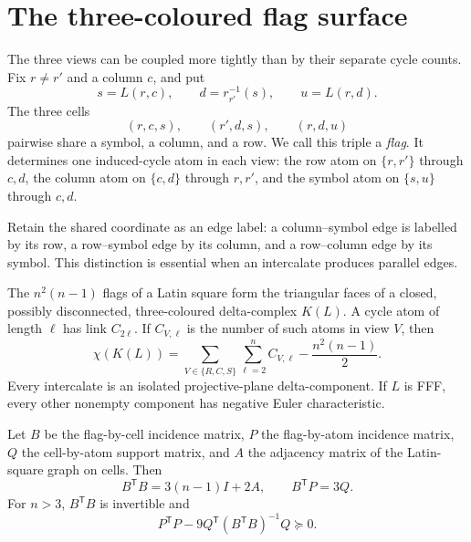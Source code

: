 \section{The three-coloured flag surface}\label{sec:flag-surface}

The three views can be coupled more tightly than by their separate cycle
counts.  Fix $r\ne r'$ and a column $c$, and put
\[
 s=L(r,c),\qquad d=r_{r'}^{-1}(s),\qquad u=L(r,d).
\]
The three cells
\[
 (r,c,s),\qquad (r',d,s),\qquad (r,d,u)
\]
pairwise share a symbol, a column, and a row.  We call this triple a
\emph{flag}.  It determines one induced-cycle atom in each view: the row
atom on $\{r,r'\}$ through $c,d$, the column atom on $\{c,d\}$ through
$r,r'$, and the symbol atom on $\{s,u\}$ through $c,d$.

Retain the shared coordinate as an edge label: a column--symbol edge is
labelled by its row, a row--symbol edge by its column, and a row--column edge
by its symbol.  This distinction is essential when an intercalate produces
parallel edges.

\begin{theorem}
\label{thm:flag-surface}
The $n^2(n-1)$ flags of a Latin square form the triangular faces of a closed,
possibly disconnected, three-coloured delta-complex $K(L)$.  A cycle atom of
length $\ell$ has link $C_{2\ell}$.  If $C_{V,\ell}$ is the number of such
atoms in view $V$, then
\[
 \chi(K(L))=
 \sum_{V\in\{R,C,S\}}\sum_{\ell=2}^n C_{V,\ell}
 -\frac{n^2(n-1)}2.
\]
Every intercalate is an isolated projective-plane delta-component.  If $L$
is FFF, every other nonempty component has negative Euler characteristic.

Let $B$ be the flag-by-cell incidence matrix, $P$ the flag-by-atom incidence
matrix, $Q$ the cell-by-atom support matrix, and $A$ the adjacency matrix of
the Latin-square graph on cells.  Then
\[
 B^{\mathsf T}B=3(n-1)I+2A,
 \qquad B^{\mathsf T}P=3Q.
\]
For $n>3$, $B^{\mathsf T}B$ is invertible and
\[
 P^{\mathsf T}P-
 9Q^{\mathsf T}(B^{\mathsf T}B)^{-1}Q\succeq0.
\]
\end{theorem}

